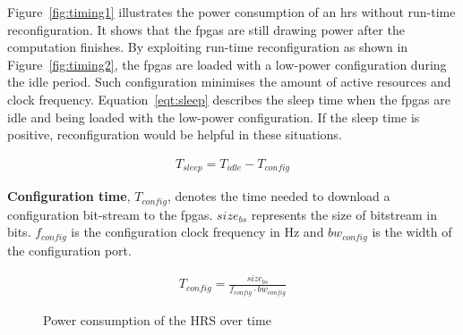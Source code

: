 Figure~\ref{fig:timing1} illustrates the power consumption of an \gls{hrs} without run-time reconfiguration.
It shows that the \gls{fpga}s are still drawing power after the computation finishes.
By exploiting run-time reconfiguration as shown in Figure~\ref{fig:timing2}, the \gls{fpga}s are loaded with a low-power configuration during the idle period.
Such configuration minimises the amount of active resources and clock frequency.
Equation~\ref{eqt:sleep} describes the sleep time when the \gls{fpga}s are idle and being loaded with the low-power configuration.
If the sleep time is positive, reconfiguration would be helpful in these situations.

\begin{equation}
\begin{aligned}
T_{sleep} = T_{idle} - T_{config}
\end{aligned}
\label{eqt:sleep}
\end{equation}

\textbf{Configuration time}, $T_{config}$, denotes the time needed to download a configuration bit-stream to the \gls{fpga}s.
$size_{bs}$ represents the size of bitstream in bits.
$f_{config}$ is the configuration clock frequency in Hz and $bw_{config}$ is the width of the configuration port.

\begin{equation}
\begin{aligned}
T_{config} = \frac{size_{bs}}{f_{config} \cdot bw_{config}}
\end{aligned}
\label{eqt:cf}
\end{equation}

\setcounter{subfigure}{0}
\begin{figure}[t!]
\centering
{}
\caption{Power consumption of the HRS over time}
\label{fig:timing}
\end{figure}

